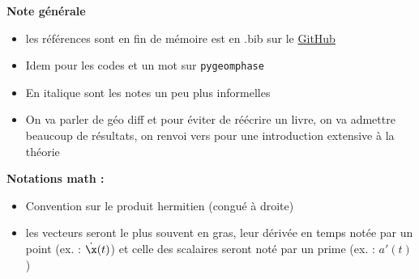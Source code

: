 	
	
	
	
	
	


\textbf{Note générale}
\begin{itemize}
	
	\item les références sont en fin de mémoire est en .bib sur le \href{https://github.com/GregoireDoat/StageM2}{GitHub}
	
	\item Idem pour les codes et un mot sur \texttt{pygeomphase}
	
	\item En italique sont les notes un peu plus informelles
	
	
	\item On va parler de géo diff et pour éviter de réécrire un livre, on va admettre beaucoup de résultats, on renvoi vers \cite{lafontaine_introduction_2015, nakahara_geometry_2003}  pour une introduction extensive à la théorie
	
\end{itemize}
\skipl

\textbf{Notations math :}
\begin{itemize}
	
	\item Convention sur le produit hermitien (congué à droite)
	
	\item les vecteurs seront le plus souvent en gras, leur dérivée en temps notée par un point (ex. : $\dot{\x}(t)$) et celle des scalaires seront noté par un prime (ex. : $a'(t)$)
	
\end{itemize}
\skipl



